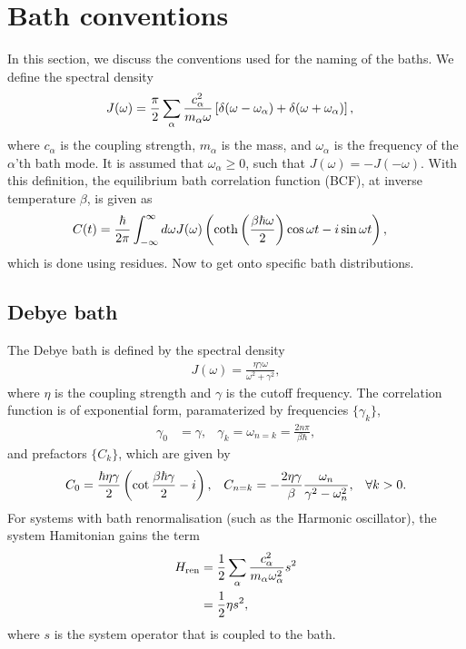 \documentclass{article}
\begin{document}
\section{Bath conventions}
In this section, we discuss the conventions used for the naming of the baths. We define the spectral density
\begin{align}
    J(\omega)&= \frac{\pi}{2}\sum_{\alpha} \frac{c_{\alpha}^2}{m_\alpha\omega} \left[\delta(\omega - \omega_\alpha) + \delta(\omega + \omega_\alpha) \right],
\end{align}
where $c_\alpha$ is the coupling strength, $m_\alpha$ is the mass, and $\omega_\alpha$ is the frequency of the $\alpha$'th bath mode. It is assumed that $\omega_\alpha \geq 0$, such that $J(\omega)=-J(-\omega)$. 
With this definition, the equilibrium bath correlation function  (BCF), at inverse temperature $\beta$, is given as
\begin{align}
    C(t) &= \frac{\hbar}{2\pi}\int_{-\infty}^\infty d\omega J(\omega)\left(\coth\left(\frac{\beta\hbar\omega}{2}\right) \cos\omega t - i\sin\omega t\right),
\end{align}
which is done using residues.
Now to get onto specific bath distributions.

\subsection{Debye bath}
The Debye bath is defined by the spectral density
\begin{align}
    J(\omega) =\frac{\eta \gamma \omega}{\omega^2+\gamma^2},
\end{align}
where $\eta$ is the coupling strength and $\gamma$ is the cutoff frequency.
The correlation function is of exponential form, paramaterized by frequencies $\{\gamma_k\}$,
\begin{align}
    \gamma_0 &= \gamma, & \gamma_k = \omega_{n=k} = \frac{2n\pi}{\beta\hbar},
\end{align}
and prefactors $\{C_k\}$, which are given by
\begin{align}
    C_0 = \frac{\hbar\eta\gamma}{2}\left(\cot{\frac{\beta\hbar\gamma}{2}}-i\right),&
     & C_{n=k} &= -\frac{2\eta\gamma}{\beta}\frac{\omega_n}{\gamma^2-\omega_n^2}, & \forall k>0.
\end{align}
For systems with bath renormalisation (such as the Harmonic oscillator), the system Hamitonian gains the term
\begin{align}
    H_{\rm ren} &= \frac{1}{2}\sum_{\alpha}\frac{c_\alpha^2}{m_\alpha\omega_\alpha^2}{s}^2 \nonumber \\ &= \frac{1}{2}\eta s^2,
\end{align}
where $s$ is the system operator that is coupled to the bath.
\end{document}
